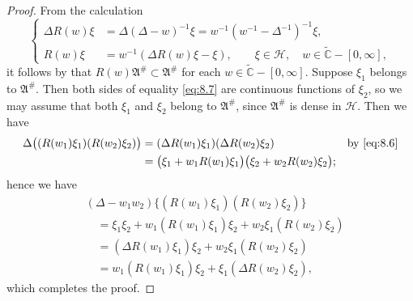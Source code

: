 \documentclass[12pt,b5paper,twoside]{article}
\theoremstyle{takesaki}
\numberwithin{equation}{section}
\begin{document}
\begin{proof}
From the calculation
\begin{equation}
\left\{
\begin{aligned}
 \Delta R(w)\xi
   &=\Delta(\Delta-w)^{-1}\xi
     =w^{-1}(w^{-1}-\Delta^{-1})^{-1}\xi,\\
 R(w)\xi
   &=w^{-1}(\Delta R(w)\xi-\xi),
   \qquad \xi\in\mathcal H,
   \quad w\in\widetilde{\mathbb C}-[0,\infty],
\end{aligned}
\right.
\tag{8.8}\label{eq:8.8}
\end{equation}
it follows by  that
$R(w)\mathfrak A^{\#}\subset\mathfrak A^{\#}$ for each
$w\in\widetilde{\mathbb C}-[0,\infty]$.  Suppose $\xi_1$ belongs to
$\mathfrak A^{\#}$.  Then both sides of equality \eqref{eq:8.7} are
continuous functions of $\xi_2$, so we may assume that both $\xi_1$
and $\xi_2$ belong to $\mathfrak A^{\#}$, since
$\mathfrak A^{\#}$ is dense in $\mathcal H$.  Then we have
\begin{align*}
 \Delta\bigl((R(w_1)\xi_1)(R(w_2)\xi_2)\bigr)
 &= (\Delta R(w_1)\xi_1)(\Delta R(w_2)\xi_2)
       &&\text{by \eqref{eq:8.6}}\\
 &=\bigl(\xi_1+w_1R(w_1)\xi_1\bigr)
   \bigl(\xi_2+w_2R(w_2)\xi_2\bigr);
\end{align*}
hence we have
\begin{align*}
 &(\Delta-w_1w_2)\{(R(w_1)\xi_1)(R(w_2)\xi_2)\}\\
 &\quad=\xi_1\xi_2+w_1(R(w_1)\xi_1)\xi_2
        +w_2\xi_1(R(w_2)\xi_2)\\
 &\quad=(\Delta R(w_1)\xi_1)\xi_2
        +w_2\xi_1(R(w_2)\xi_2)\\
 &\quad=w_1(R(w_1)\xi_1)\xi_2
        +\xi_1(\Delta R(w_2)\xi_2),
\end{align*}
which completes the proof.
\end{proof}
\end{document}
